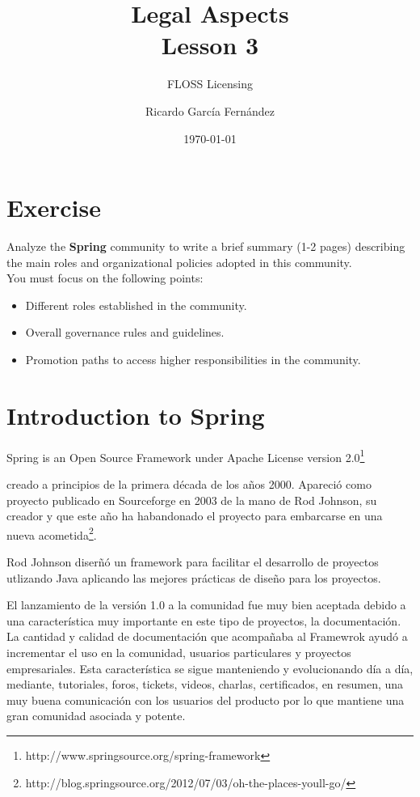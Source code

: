 \documentclass[11pt]{scrartcl}
\title{\textbf{Legal Aspects\\
				Lesson 3}}
\subtitle{FLOSS Licensing}
\author{Ricardo Garc\'ia Fern\'andez}
\date{\today}
\begin{document}
\maketitle

\section{Exercise}

Analyze the \textbf{Spring} community to write a brief summary (1-2 pages) describing the main roles and organizational policies adopted in this community.\\

You must focus on the following points:

\begin{itemize}

	\item Different roles established in the community.
	\item Overall governance rules and guidelines.
	\item Promotion paths to access higher responsibilities in the community.
\end{itemize}

\section{Introduction to Spring}

Spring is an Open Source Framework under Apache License version 2.0\footnote{http://www.springsource.org/spring-framework} 

creado a principios de la primera década de los años 2000. Apareció como proyecto publicado en Sourceforge en 2003 de la mano de Rod Johnson, su creador y que este año ha habandonado el proyecto para embarcarse en una nueva acometida\footnote{http://blog.springsource.org/2012/07/03/oh-the-places-youll-go/}.

Rod Johnson diserñó un framework para facilitar el desarrollo de proyectos utlizando Java aplicando las mejores prácticas de diseño para los proyectos. 

El lanzamiento de la versión 1.0 a la comunidad fue muy bien aceptada debido a una característica muy importante en este tipo de proyectos, la documentación. La cantidad y calidad de documentación que acompañaba al Framewrok ayudó a incrementar el uso en la comunidad, usuarios particulares y proyectos empresariales.
Esta característica se sigue manteniendo y evolucionando día a día, mediante, tutoriales, foros, tickets, videos, charlas, certificados, en resumen, una muy buena comunicación con los usuarios del producto por lo que mantiene una gran comunidad asociada y potente.
\end{document}
